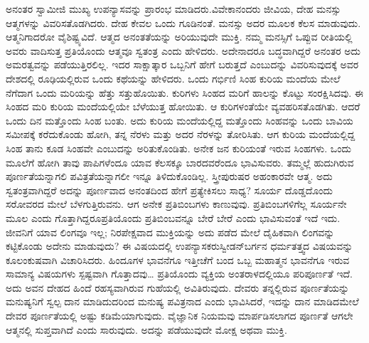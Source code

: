  ಅನಂತರ ಸ್ವಾಮೀಜಿ ಮುಖ್ಯ ಉಪನ್ಯಾಸವನ್ನು ಪ್ರಾರಂಭ ಮಾಡಿದರು.\break ವಿವೇಕಾನಂದರು ಜೀವಿಯ, ದೇಹ ಮನಸ್ಸು ಆತ್ಮಗಳನ್ನು ವಿವರಿಸತೊಡಗಿದರು. ದೇಹ ಕೇವಲ ಒಂದು ಗೂಡಿನಂತೆ. ಮನಸ್ಸು ಅದರ ಮೂಲಕ ಕೆಲಸ ಮಾಡುವುದು. ಆತ್ಮನಿಗಾದರೋ ವೈಶಿಷ್ಟ್ಯವಿದೆ. ಆತ್ಮದ ಅನಂತತೆಯನ್ನು ಅರಿಯುವುದೇ ಮುಕ್ತಿ. ನಮ್ಮ ಮನಸ್ಸಿಗೆ ಒಪ್ಪುವ ರೀತಿಯಲ್ಲಿ ಅವರು ವಾದಿಸುತ್ತ ಪ್ರತಿಯೊಂದು ಆತ್ಮವೂ ಸ್ವತಂತ್ರ ಎಂದು ಹೇಳಿದರು. ಅದೇನಾದರೂ ಬದ್ಧವಾಗಿದ್ದರೆ ಅನಂತರ ಅದು ಅಮರತ್ವವನ್ನು ಪಡೆಯುತ್ತಿರಲಿಲ್ಲ. ಇದರ ಸಾಕ್ಷಾತ್ಕಾರ ಒಬ್ಬನಿಗೆ ಹೇಗೆ ಬರುತ್ತದೆ ಎಂಬುದನ್ನು ವಿವರಿಸುವುದಕ್ಕೆ ಅವರ ದೇಶದಲ್ಲಿ ರೂಢಿಯಲ್ಲಿರುವ ಒಂದು ಕಥೆಯನ್ನು ಹೇಳಿದರು. ಒಂದು ಗರ್ಭಿಣಿ ಸಿಂಹ ಕುರಿಯ ಮಂದೆಯ ಮೇಲೆ ನೆಗೆದಾಗ ಒಂದು ಮರಿಯನ್ನು ಹೆತ್ತು ಸತ್ತುಹೊಯಿತು. ಕುರಿಗಳು ಸಿಂಹದ ಮರಿಗೆ ಹಾಲನ್ನು ಕೊಟ್ಟು ಸಂರಕ್ಷಿಸಿದವು. ಈ ಸಿಂಹದ ಮರಿ ಕುರಿಯ ಮಂದೆಯಲ್ಲಿಯೇ ಬೆಳೆಯುತ್ತ ಹೋಯಿತು. ಆ ಕುರಿಗಳಂತೆಯೇ ವ್ಯವಹರಿಸತೊಡಗಿತು. ಆದರೆ ಒಂದು ದಿನ ಮತ್ತೊಂದು ಸಿಂಹ ಬಂತು. ಅದು ಕುರಿಯ ಮಂದೆಯಲ್ಲಿದ್ದ ಮತ್ತೊಂದು ಸಿಂಹವನ್ನು ಒಂದು ಬಾವಿಯ ಸಮೀಪಕ್ಕೆ ಕರೆದುಕೊಂಡು ಹೋಗಿ, ತನ್ನ ನೆರಳು ಮತ್ತು ಅದರ ನೆರಳನ್ನು ತೋರಿಸಿತು. ಆಗ ಕುರಿಯ ಮಂದೆಯಲ್ಲಿದ್ದ ಸಿಂಹ ತಾನು ಕೂಡ ಸಿಂಹವೇ ಎಂಬುದನ್ನು ಅರಿತುಕೊಂಡಿತು. ಅನೇಕ ಜನ ಕುರಿಯಂತೆ ಇರುವ ಸಿಂಹಗಳು. ಒಂದು ಮೂಲೆಗೆ ಹೋಗಿ ತಾವು ಪಾಪಿಗಳೆಂದೂ ಯಾವ ಕೆಲಸಕ್ಕೂ ಬಾರದವರೆಂದೂ ಭಾವಿಸುವರು. ತಮ್ಮಲ್ಲೆ ಹುದುಗಿರುವ ಪೂರ್ಣತೆಯನ್ನಾಗಲಿ ಪವಿತ್ರತೆಯನ್ನಾಗಲೀ ಇನ್ನೂ ತಿಳಿದುಕೊಂಡಿಲ್ಲ. ಸ್ತ್ರೀಪುರುಷರ ಅಹಂಕಾರವೇ ಆತ್ಮ. ಅದು ಸ್ವತಂತ್ರವಾಗಿದ್ದರೆ ಅದನ್ನು ಪೂರ್ಣವಾದ ಅನಂತದಿಂದ ಹೇಗೆ ಪ್ರತ್ಯೇಕಿಸಲು ಸಾಧ್ಯ? ಸೂರ್ಯ ದೊಡ್ಡದೊಂದು ಸರೋವರದ ಮೇಲೆ ಬೆಳಗುತ್ತಿರುವನು. ಆಗ ಅನೇಕ ಪ್ರತಿಬಿಂಬಗಳು ಕಾಣುವುವು. ಪ್ರತಿಬಿಂಬಗಳಿಗೆಲ್ಲ ಸೂರ್ಯನೇ ಮೂಲ ಎಂದು ಗೊತ್ತಾಗಿದ್ದರೂ\break ಪ್ರತಿಯೊಂದು ಪ್ರತಿಬಿಂಬವನ್ನೂ ಬೇರೆ ಬೇರೆ ಎಂದು ಭಾವಿಸುವಂತೆ ಇದೆ ಇದು. ಜೀವನಿಗೆ ಯಾವ ಲಿಂಗವೂ ಇಲ್ಲ; ನಿರಪೇಕ್ಷವಾದ ಮುಕ್ತಿಯನ್ನು ಅದು ಪಡೆದ ಮೇಲೆ ದೈಹಿಕವಾಗಿ ಲಿಂಗವನ್ನು ಕಟ್ಟಿಕೊಂಡು ಅದೇನು ಮಾಡುವುದು? ಈ ವಿಷಯದಲ್ಲಿ ಉಪನ್ಯಾಸಕರು\break ಸ್ವೀಡನ್‍ಬರ್ಗನ ಧರ್ಮತತ್ತ್ವದ ವಿಷಯವನ್ನು ಕೂಲಂಕುಷವಾಗಿ ವಿಚಾರಿಸಿದರು. ಹಿಂದೂಗಳ ಭಾವನೆಗೂ ಇತ್ತೀಚೆಗೆ ಬಂದ ಒಬ್ಬ ಮಹಾತ್ಮನ ಭಾವನೆಗೂ ಇರುವ ಸಾಮಾನ್ಯ ವಿಷಯಗಳು ಸ್ಪಷ್ಟವಾಗಿ ಗೊತ್ತಾದವು… ಪ್ರತಿಯೊಂದು ವ್ಯಕ್ತಿಯ ಅಂತರಾಳದಲ್ಲಿಯೂ ಪರಿಪೂರ್ಣತೆ ಇದೆ. ಅದು ಅವನ ದೇಹದ ಹಿಂದೆ ರಹಸ್ಯವಾಗಿರುವ ಗುಹೆಯಲ್ಲಿ ಅವಿತಿರುವುದು. ದೇವರು ತನ್ನಲ್ಲಿರುವ ಪೂರ್ಣತೆಯನ್ನು ಮನುಷ್ಯನಿಗೆ ಸ್ವಲ್ಪ ದಾನ ಮಾಡಿದುದರಿಂದ ಮನುಷ್ಯ ಪವಿತ್ರನಾದ ಎಂದು ಭಾವಿಸಿದರೆ, ಇದನ್ನು ದಾನ ಮಾಡಿದಮೇಲೆ ದೇವರ ಪೂರ್ಣತೆಯಲ್ಲಿ ಅಷ್ಟು ಕಡಿಮೆಯಾಗುವುದು. ವೈಜ್ಞಾನಿಕ ನಿಯಮವು ಮಾರ್ಪಡಿಸಲಾಗದ ಪೂರ್ಣತೆ ಆಗಲೇ ಆತ್ಮನಲ್ಲಿ ಸುಪ್ತವಾಗಿದೆ ಎಂದು ಸಾರುವುದು. ಅದನ್ನು ಪಡೆಯುವುದೇ ಮೋಕ್ಷ ಅಥವಾ ಮುಕ್ತಿ. 

